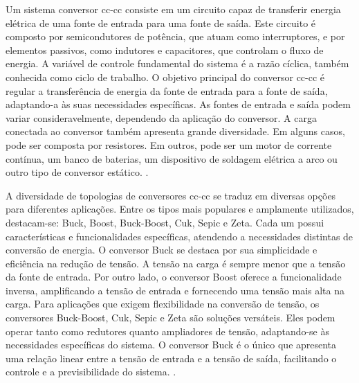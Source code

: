 Um sistema conversor \acrshort{cc}-\acrshort{cc} consiste em um circuito capaz de transferir energia elétrica de uma fonte de entrada para uma fonte de saída. Este circuito é composto por semicondutores de potência, que atuam como interruptores, e por elementos passivos, como indutores e capacitores, que controlam o fluxo de energia. A variável de controle fundamental do sistema é a razão cíclica, também conhecida como ciclo de trabalho. O objetivo principal do conversor \acrshort{cc}-\acrshort{cc} é regular a transferência de energia da fonte de entrada para a fonte de saída, adaptando-a às suas necessidades específicas. As fontes de entrada e saída podem variar consideravelmente, dependendo da aplicação do conversor. A carga conectada ao conversor também apresenta grande diversidade. Em alguns casos, pode ser composta por resistores. Em outros, pode ser um motor de corrente contínua, um banco de baterias, um dispositivo de soldagem elétrica a arco ou outro tipo de conversor estático. \cite{martins2008}.


A diversidade de topologias de conversores \acrshort{cc}-\acrshort{cc} se traduz em diversas opções para diferentes aplicações. Entre os tipos mais populares e amplamente utilizados, destacam-se: Buck, Boost, Buck-Boost, Cuk, Sepic e Zeta. Cada um possui características e funcionalidades específicas, atendendo a necessidades distintas de conversão de energia. O conversor Buck se destaca por sua simplicidade e eficiência na redução de tensão. A tensão na carga é sempre menor que a tensão da fonte de entrada. Por outro lado, o conversor Boost oferece a funcionalidade inversa, amplificando a tensão de entrada e fornecendo uma tensão mais alta na carga. Para aplicações que exigem flexibilidade na conversão de tensão, os conversores Buck-Boost, Cuk, Sepic e Zeta são soluções versáteis. Eles podem operar tanto como redutores quanto ampliadores de tensão, adaptando-se às necessidades específicas do sistema. O conversor Buck é o único que apresenta uma relação linear entre a tensão de entrada e a tensão de saída, facilitando o controle e a previsibilidade do sistema. \cite{martins2008}.

